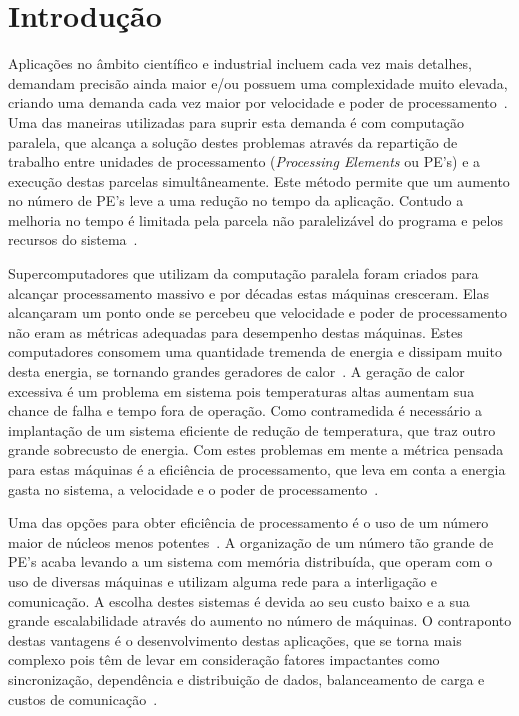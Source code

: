 \documentclass[
	12pt,				%
	openright,			%
	twoside,			%
	a4paper,			%
	english,			%
	brazil,				%
	]{abntex2}
\begin{document}
\section{Introdução}
\label{sec:introducao}

Aplicações no âmbito científico e industrial incluem cada vez mais detalhes, demandam precisão ainda maior e/ou possuem uma complexidade muito elevada, criando uma demanda cada vez maior por velocidade e poder de processamento~\cite{pilla-thesis}. Uma das maneiras utilizadas para suprir esta demanda é com computação paralela, que alcança a solução destes problemas através da repartição de trabalho entre unidades de processamento (\textit{Processing Elements} ou PE's) e a execução destas parcelas simultâneamente. Este método permite que um aumento no número de PE’s leve a uma redução no tempo da aplicação. Contudo a melhoria no tempo é limitada pela parcela não paralelizável do programa e pelos recursos do sistema~\cite{amdahl}. 

Supercomputadores que utilizam da computação paralela foram criados para alcançar processamento massivo e por décadas estas máquinas cresceram. Elas alcançaram um ponto onde se percebeu que velocidade e poder de processamento não eram as métricas adequadas para desempenho destas máquinas. Estes computadores consomem uma quantidade tremenda de energia e dissipam muito desta energia, se tornando grandes geradores de calor~\cite{green500}. A geração de calor excessiva é um problema em sistema pois temperaturas altas aumentam sua chance de falha e tempo fora de operação. Como contramedida é necessário a implantação de um sistema eficiente de redução de temperatura, que traz outro grande sobrecusto de energia. Com estes problemas em mente a métrica pensada para estas máquinas é a eficiência de processamento, que leva em conta a energia gasta no sistema, a velocidade e o poder de processamento~\cite{efficient-metric}.

Uma das opções para obter eficiência de processamento é o uso de um número maior de núcleos menos potentes~\cite{snir-encyclopedia}. A organização de um número tão grande de PE’s acaba levando a um sistema com memória distribuída, que operam com o uso de diversas máquinas e utilizam alguma rede para a interligação e comunicação. A escolha destes sistemas é devida ao seu custo baixo e a sua grande escalabilidade através do aumento no número de máquinas. O contraponto destas vantagens é o desenvolvimento destas aplicações, que se torna mais complexo pois têm de levar em consideração fatores impactantes como sincronização, dependência e distribuição de dados, balanceamento de carga e custos de comunicação~\cite{pilla-thesis}.
\end{document}
